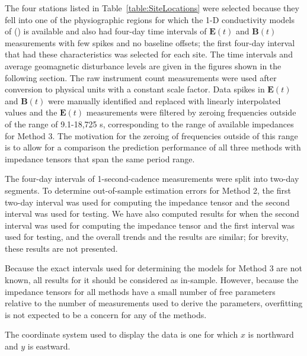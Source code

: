 \documentclass[12pt]{article}
\begin{document}
The four stations listed in Table~\ref{table:SiteLocations} were selected because they fell into one of the physiographic regions for which the 1-D conductivity models of (\cite{Fernberg2012}) is available and also had four-day time intervals of $\mathbf{E}(t)$ and $\mathbf{B}(t)$ measurements with few spikes and no baseline offsets; the first four-day interval that had these characteristics was selected for each site.  The time intervals and average geomagnetic disturbance levels are given in the figures shown in the following section.  The raw instrument count measurements were used after conversion to physical units with a constant scale factor.  Data spikes in $\mathbf{E}(t)$ and $\mathbf{B}(t)$ were manually identified and replaced with linearly interpolated values and the $\mathbf{E}(t)$ measurements were filtered by zeroing frequencies outside of the range of 9.1-18,725 s, corresponding to the range of available impedances for Method 3.  The motivation for the zeroing of frequencies outside of this range is to allow for a comparison the prediction performance of all three methods with impedance tensors that span the same period range.


The four-day intervals of 1-second-cadence measurements were split into two-day segments.  To determine out-of-sample estimation errors for Method 2, the first two-day interval was used for computing the impedance tensor and the second interval was used for testing. We have also computed results for when the second interval was used for computing the impedance tensor and the first interval was used for testing, and the overall trends and the results are similar; for brevity, these results are not presented.

Because the exact intervals used for determining the models for Method 3 are not known, all results for it should be considered as in-sample. However, because the impedance tensors for all methods have a small number of free parameters relative to the number of measurements used to derive the parameters, overfitting is not expected to be a concern for any of the methods.

The coordinate system used to display the data is one for which $x$ is northward and $y$ is eastward.
\end{document}
